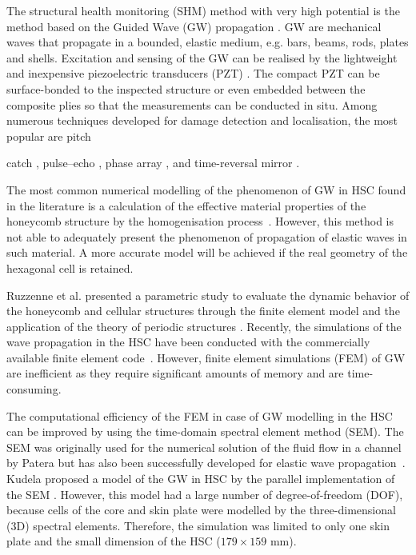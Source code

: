 \documentclass[a4paper,12pt]{article}
\begin{document}
The structural health monitoring (SHM) method with very high potential is the method based on the Guided Wave (GW) propagation \cite{mustapha2011assessment, sikdar2016guided, sikdar2016ultrasonic,radzienski2016assessment, yu2019core}.
GW are mechanical waves that propagate in a bounded, elastic medium, e.g. bars, 
beams, rods, plates and shells.
Excitation and sensing of the GW can be realised by the lightweight and inexpensive piezoelectric transducers (PZT) \cite{giurgiutiumicromechatronics}.
The compact PZT can be surface-bonded to the inspected structure or even embedded between the composite plies so that the measurements can be conducted in situ. Among numerous techniques developed for damage detection and localisation, the most popular are pitch{catch \cite{ihn2008pitch, sikdar2017structural}, pulse--echo \cite{guo1993interaction, kudela2008damage}, phase array \cite{lu2006crack, ostachowicz2008elastic}, and time-reversal mirror \cite{fink1992time, eremin2016analytically}.

The most common numerical modelling of the phenomenon of GW in HSC found in the literature is a calculation of the effective material properties of the 
honeycomb structure by the homogenisation process~\cite{shi1995derivation, qi2008ultrasonic, mustapha2014leaky, baid2015dispersion, sikdar2016guided}.
However, this method is not able to adequately present the phenomenon of 
propagation of elastic waves in such material.
A more accurate model will be achieved if the real geometry of the hexagonal 
cell is retained.

Ruzzenne et al. presented a parametric study to evaluate the dynamic behavior of the honeycomb and cellular structures through the finite element model 
and the application of the theory of periodic structures \cite{ruzzene2003wave}.
Recently, the simulations of the wave propagation in the HSC have been conducted 
with the commercially available finite element code~\cite{song2009guided, 
hosseini2013numerical, tian2015wavenumber, zhao2018wave}.
However, finite element simulations (FEM) of GW are inefficient as they require 
significant amounts of memory and are time-consuming.

The computational efficiency of the FEM in case of GW modelling in the HSC can be improved by using the time-domain spectral element method (SEM).
The SEM was originally used for the numerical solution of the fluid flow 
in a channel by Patera \cite{patera1984spectral} but has also been successfully developed for elastic wave propagation~\cite{ostachowicz2011guided}. 
Kudela proposed a model of the GW in HSC by the parallel implementation of the SEM \cite{kudela2016parallel}.
However, this model had a large number of degree-of-freedom (DOF), because cells of the core and skin plate were modelled by the three-dimensional (3D) spectral elements.
Therefore, the simulation was limited to only one skin plate and the small dimension of the HSC (\(179 \times 159 \) mm).

}
\end{document}
